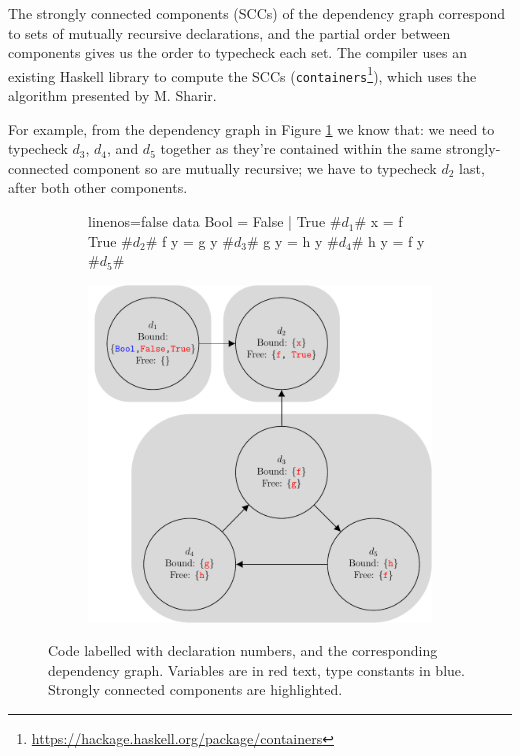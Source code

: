 \documentclass[dissertation.tex]{subfiles}
\begin{document}
{{        The strongly connected components (SCCs) of the dependency graph correspond to sets of mutually recursive declarations, and the partial order between components gives us the order to typecheck each set. The compiler uses an existing Haskell library to compute the SCCs (\texttt{containers}\footnote{\url{https://hackage.haskell.org/package/containers}}), which uses the algorithm presented by M. Sharir\cite{SCC}.

        For example, from the dependency graph in Figure \ref{fig:dependency-graph} we know that: we need to typecheck \(d_3\), \(d_4\), and \(d_5\) together as they're contained within the same strongly-connected component so are mutually recursive; we have to typecheck \(d_2\) last, after both other components.

        \begin{figure}[h]
        \centering
        \begin{subfigure}[t]{0.4\textwidth}
            \begin{haskellfigure*}{linenos=false}
            data Bool = False | True      #\(d_1\)#
            x = f True                    #\(d_2\)#
            f y = g y                     #\(d_3\)#
            g y = h y                     #\(d_4\)#
            h y = f y                     #\(d_5\)#
            \end{haskellfigure*}
        \end{subfigure}
        \begin{subfigure}[t]{0.5\textwidth}
            \includegraphics[width=\textwidth, valign=t]{figures/dependency_graph.pdf}
        \end{subfigure}
        \caption
        {
            Code labelled with declaration numbers, and the corresponding dependency graph. Variables are in red text, type constants in blue. Strongly connected components are highlighted.
        }
        \label{fig:dependency-graph}
        \end{figure}

}}
\end{document}
